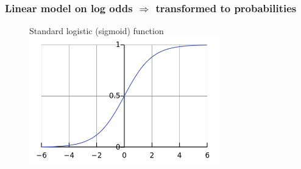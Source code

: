 \documentclass[xcolor={dvipsnames}]{beamer}
\begin{document}
\frame
{
\frametitle{Linear model on log odds $\Longrightarrow$ transformed to probabilities}
 
\normalsize
\begin{figure}
\centering

Standard logistic (sigmoid) function
\Huge {}\includegraphics[width=3.25in]{stuff/Logistic-curve.png} \textcolor{white}{$\hat Y$} \normalsize

\vspace{-7em}

\end{figure}
}
\end{document}
